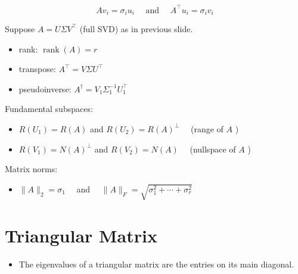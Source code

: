 \documentclass[14pt]{article}
\theoremstyle{definition}
\theoremstyle{remark}
\begin{document}
\begin{multicols}{2}
    $$
        A v_{i}=\sigma_{i} u_{i} \quad \text { and } \quad A^{\top} u_{i}=\sigma_{i} v_{i}
    $$

    Suppose $A=U \Sigma V^{\top}$ (full SVD) as in previous slide.

    \begin{itemize}
        \item rank: $
                  \operatorname{rank}(A)=r$

        \item transpose: $A^{\top}=V \Sigma U^{\top}$

        \item pseudoinverse: $A^{\dagger}=V_{1} \Sigma_{1}^{-1} U_{1}^{\top}$

    \end{itemize}

    Fundamental subspaces:

    \begin{itemize}
        \item $R\left(U_{1}\right)=R(A)$ and $R\left(U_{2}\right)=R(A)^{\perp} \quad$ (range of $A$ )

        \item $R\left(V_{1}\right)=N(A)^{\perp}$ and $R\left(V_{2}\right)=N(A) \quad$ (nullspace of $A$ )

    \end{itemize}

    Matrix norms:

    \begin{itemize}
        \item $\|A\|_{2}=\sigma_{1} \quad$ and $\quad\|A\|_{F}=\sqrt{\sigma_{1}^{2}+\cdots+\sigma_{r}^{2}}$
    \end{itemize}
\end{multicols}

\headrule

\section{Triangular Matrix}
\begin{itemize}
    \item The eigenvalues of a triangular matrix are the entries on its main diagonal.
\end{itemize}

\headrule

\end{document}
